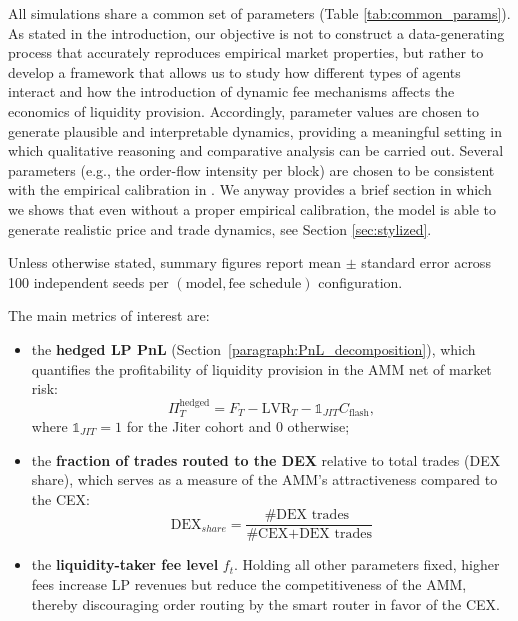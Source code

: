 \documentclass[11pt]{article}
\begin{document}
All simulations share a common set of parameters (Table \ref{tab:common_params}). As stated in the introduction, 
our objective is not to construct a data-generating process that accurately reproduces empirical market properties, 
but rather to develop a framework that allows us to study how different types of agents interact and how the 
introduction of dynamic fee mechanisms affects the economics of liquidity provision. Accordingly, parameter values 
are chosen to generate plausible and interpretable dynamics, providing a meaningful setting in which qualitative 
reasoning and comparative analysis can be carried out. Several parameters (e.g., the order-flow intensity per block) 
are chosen to be consistent with the empirical calibration in \cite{dinosse_gatta}. We anyway provides a brief
section in which we shows that even without a proper empirical calibration, the model is able to generate realistic 
price and trade dynamics, see Section \ref{sec:stylized}.

Unless otherwise stated, summary figures report mean \(\pm\) standard error across 100 independent seeds per 
\((\text{model},\text{fee schedule})\) configuration.

The main metrics of interest are:
\begin{itemize}
    \item the \textbf{hedged LP PnL} (Section~\ref{paragraph:PnL_decomposition}), which quantifies the profitability of 
    liquidity provision in the AMM net of market risk:
    \begin{equation}
        \Pi_T^{\mathrm{hedged}} = F_T - \mathrm{LVR}_T - \mathbb{1}_{JIT}C_{\mathrm{flash}},
    \end{equation}
    where $\mathbb{1}_{JIT}=1$ for the Jiter cohort and $0$ otherwise;
    \item the \textbf{fraction of trades routed to the DEX} relative to total trades (DEX share), which serves as a 
    measure of the AMM’s attractiveness compared to the CEX:
    \begin{equation}
        \text{DEX}_{share} = \frac{\text{\#DEX trades }}{\text{\# CEX+DEX trades}}
    \end{equation}
    \item the \textbf{liquidity-taker fee level} $f_t$. Holding all other parameters fixed, higher fees increase LP 
    revenues but reduce the competitiveness of the AMM, thereby discouraging order routing by the smart router in favor of the CEX.
\end{itemize}
\end{document}
